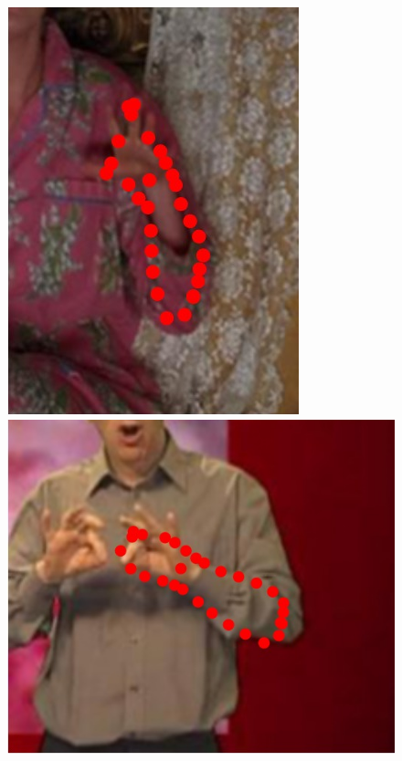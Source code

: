 \begin{figure}
    \includegraphics[height=\ofh]{resources/Annotation_Correction/Suplementory_Meterial/ExFit/0028}
    \hfill
    \includegraphics[height=\ofh]{resources/Annotation_Correction/Suplementory_Meterial/ExFit/0029}
    \hfill

\end{figure}
